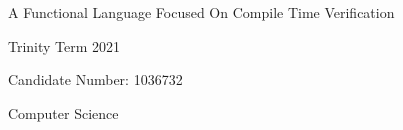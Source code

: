 \documentclass[12pt,a4paper,titlepage]{article}
\begin{document}
    \begin{titlepage}
        \begin{center}
            \vspace*{2in}
            \Huge
            A Functional Language Focused On Compile Time Verification
            \Large

            Trinity Term 2021

            Candidate Number: 1036732

            Computer Science
        \end{center}
    \end{titlepage}

    

    

    

    

    

    
    

    \singlespacing
    
\end{document}
